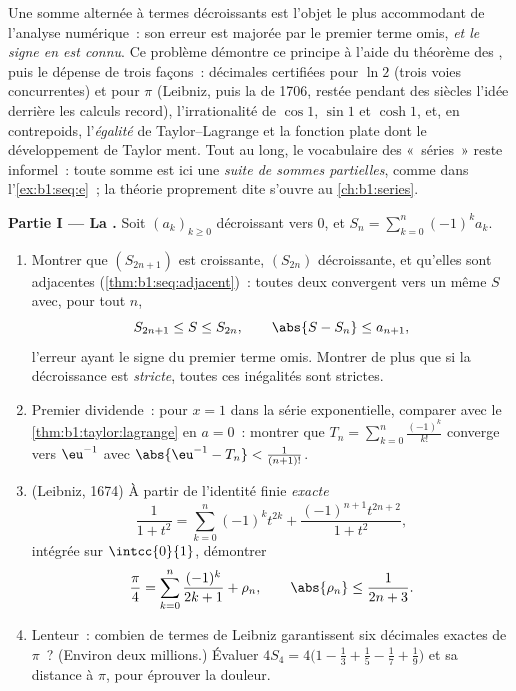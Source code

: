 \begin{problem}
\label{pb:b1:taylor:1}
Une somme alternée à termes décroissants est l'objet le plus
accommodant de l'analyse numérique~: son erreur est majorée par le
premier terme omis, \emph{et le signe en est connu}. Ce problème
démontre ce principe à l'aide du théorème des , puis
le dépense de trois façons~: décimales certifiées pour $\ln 2$ (trois
voies concurrentes) et pour $\pi$ (Leibniz, puis la 
de 1706, restée pendant des siècles l'idée derrière les calculs
record), l'irrationalité de $\cos 1$, $\sin 1$ et $\cosh 1$, et, en
contrepoids, l'\emph{égalité} de Taylor--Lagrange et la fonction plate
dont le développement de Taylor ment. Tout au long, le vocabulaire des «~séries~» reste
informel~: toute somme est ici une \emph{suite de sommes partielles},
comme dans l'\cref{ex:b1:seq:e}~; la théorie proprement dite s'ouvre
au \cref{ch:b1:series}.

\medskip
\noindent\textbf{Partie I --- La .} Soit
$(a_k)_{k \geq 0}$ décroissant vers $0$, et $S_n = \sum_{k=0}^{n}
(-1)^k a_k$.
\begin{enumerate}
  \item Montrer que $(S_{2n+1})$ est croissante, $(S_{2n})$
        décroissante, et qu'elles sont adjacentes
        (\cref{thm:b1:seq:adjacent})~: toutes deux convergent vers un
        même $S$ avec, pour tout $n$,
        \[
        S_{2n+1} \leq S \leq S_{2n},
        \qquad
        \abs{S - S_n} \leq a_{n+1} ,
        \]
        l'erreur ayant le signe du premier terme omis.
        Montrer de plus que si la décroissance est \emph{stricte},
        toutes ces inégalités sont strictes.
  \item Premier dividende~: pour $x = 1$ dans la série exponentielle,
        comparer avec le \cref{thm:b1:taylor:lagrange} en $a = 0$~:
        montrer que $T_n = \sum_{k=0}^{n} \frac{(-1)^k}{k!}$
        converge vers $\eu^{-1}$ avec $\abs{\eu^{-1} - T_n} <
        \frac{1}{(n+1)!}$.
  \item (Leibniz, 1674) À partir de l'identité finie \emph{exacte}
        \[
        \frac{1}{1 + t^2} = \sum_{k=0}^{n} (-1)^k t^{2k}
        + \frac{(-1)^{n+1} t^{2n+2}}{1 + t^2} ,
        \]
        intégrée sur $\intcc{0}{1}$, démontrer
        \[
        \frac\pi4 = \sum_{k=0}^{n} \frac{(-1)^k}{2k+1} + \rho_n,
        \qquad \abs{\rho_n} \leq \frac{1}{2n+3} .
        \]
  \item Lenteur~: combien de termes de Leibniz garantissent six
        décimales exactes de $\pi$~? (Environ deux millions.)
        Évaluer $4 S_4 = 4\bigl(1 - \frac13 + \frac15 - \frac17 +
        \frac19\bigr)$ et sa distance à $\pi$, pour éprouver la
        douleur.
\end{enumerate}


\end{problem}
